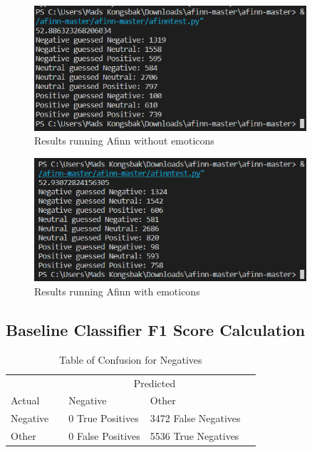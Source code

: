 \begin{figure}[H]
	\includegraphics[width=0.9\textwidth]{Images/AfinnResult}
	\caption{Results running Afinn without emoticons}
\end{figure}

\begin{figure}[H]
	\includegraphics[width=0.9\textwidth]{Images/AfinnResultEmoticons}
	\caption{Results running Afinn with emoticons}
\end{figure}

\subsection{Baseline Classifier F1 Score Calculation}

\begin{table}[H]
	\begin{tabular}{@{}lllll@{}}
		\toprule
		& & \multicolumn{2}{c}{Predicted} \\\cmidrule{2-4}
		Actual & & Negative & Other & \\ \midrule
		Negative & & 0 True Positives & 3472 False Negatives & \\
		Other  & & 0 False Positives & 5536 True Negatives & \\ \bottomrule
	\end{tabular}
	\centering
	\caption{Table of Confusion for Negatives}
	\label{blneg}
\end{table}

